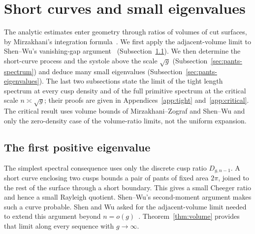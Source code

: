 \section{Short curves and small eigenvalues}\label{sec:geometry}

The analytic estimates enter geometry through ratios of volumes of cut
surfaces, by Mirzakhani's integration formula~\cite{MirInv}. We first apply the
adjacent-volume limit to Shen--Wu's vanishing-gap argument~\cite{SW}
(Subsection~\ref{sec:spectral}). We then determine the short-curve process
and the systole above the scale $\sqrt g$
(Subsection~\ref{sec:pants-spectrum}) and deduce many small eigenvalues
(Subsection~\ref{sec:pants-eigenvalues}). The last two subsections state
the limit of the tight length spectrum at every cusp density and of the
full primitive spectrum at the critical scale $n\asymp\sqrt g$; their
proofs are given in Appendices~\ref{app:tight} and~\ref{app:critical}. The
critical result uses volume bounds of Mirzakhani--Zograf and Shen--Wu
and only the zero-density case of the volume-ratio limits, not the
uniform expansion.

\subsection{The first positive eigenvalue}\label{sec:spectral}

The simplest spectral consequence uses only the discrete cusp ratio
$D_{g,n-1}$. A short curve enclosing two cusps bounds a pair of pants
of fixed area $2\pi$, joined to the rest of the surface through a short
boundary. This gives a small Cheeger ratio and hence a small Rayleigh
quotient. Shen--Wu's second-moment argument makes such a curve probable.
Shen and Wu asked for the adjacent-volume limit needed to extend
this argument beyond $n=o(g)$~\cite[Question~3]{SW}. Theorem~\ref{thm:volume}
provides that limit along every sequence with $g\to\infty$.

